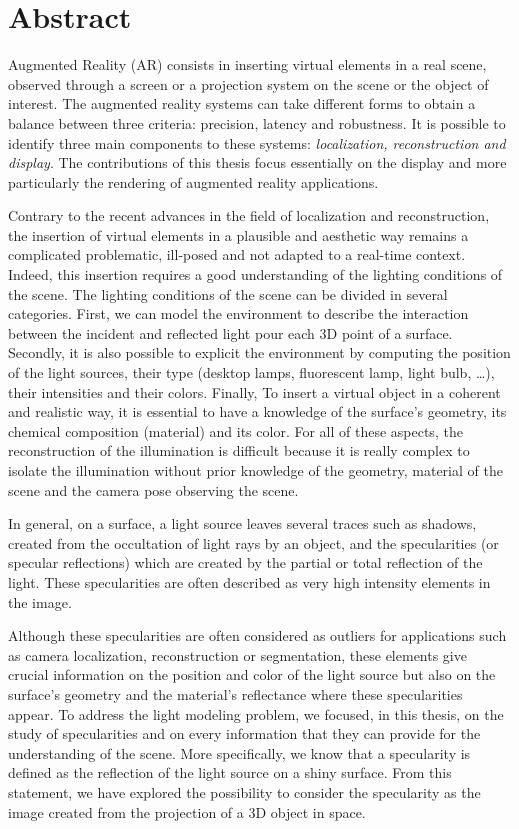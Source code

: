 \chapter*{Abstract}

\vspace{-0.8cm}

Augmented Reality (AR) consists in inserting virtual elements in a real scene, observed through a screen or a projection system on the scene or the object of interest. The augmented reality systems can take different forms to obtain a balance between three criteria: precision, latency and robustness. It is possible to identify three main components to these systems: \textit{localization, reconstruction and display}. The contributions of this thesis focus essentially on the display and more particularly the rendering of augmented reality applications.

Contrary to the recent advances in the field of localization and reconstruction, the insertion of virtual elements in a plausible and aesthetic way remains a complicated problematic, ill-posed and not adapted to a real-time context. Indeed, this insertion requires a good understanding of the lighting conditions of the scene. The lighting conditions of the scene can be divided in several categories. First, we can model the environment to describe the interaction between the incident and reflected light pour each 3D point of a surface. Secondly, it is also possible to explicit the environment by computing the position of the light sources, their type (desktop lamps, fluorescent lamp, light bulb, \ldots), their intensities and their colors. Finally, To insert a virtual object in a coherent and realistic way, it is essential to have a knowledge of the surface's geometry, its chemical composition (material) and its color. For all of these aspects, the reconstruction of the illumination is difficult because it is really complex to isolate the illumination without prior knowledge of the geometry, material of the scene and the camera pose observing the scene.

In general, on a surface, a light source leaves several traces such as shadows, created from the occultation of light rays by an object, and the specularities (or specular reflections) which are created by the partial or total reflection of the light. These specularities are often described as very high intensity elements in the image.

Although these specularities are often considered as outliers for applications such as camera localization, reconstruction or segmentation, these elements give crucial information on the position and color of the light source but also on the surface's geometry and the material's reflectance where these specularities appear. To address the light modeling problem, we focused, in this thesis, on the study of specularities and on every information that they can provide for the understanding of the scene. More specifically, we know that a specularity is defined as the reflection of the light source on a shiny surface. From this statement, we have explored the possibility to consider the specularity as the image created from the projection of a 3D object in space.

